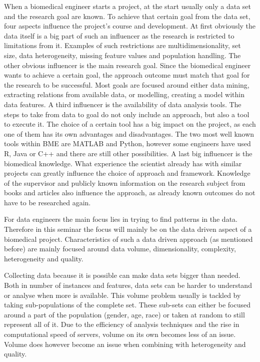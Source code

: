 \documentclass[10pt,a4paper]{article}
\begin{document}
	When a biomedical engineer starts a project, at the start usually only a data set and the research goal are known. To achieve that certain goal from the data set, four aspects influence the project's course and development. At first obviously the data itself is a big part of such an influencer as the research is restricted to limitations from it. Examples of such restrictions are multidimensionality, set size, data heterogeneity, missing feature values and population handling. The other obvious influencer is the main research goal. Since the biomedical engineer wants to achieve a certain goal, the approach outcome must match that goal for the research to be successful. Most goals are focused around either data mining, extracting relations from available data, or modelling, creating a model within data features. A third influencer is the availability of data analysis tools. The steps to take from data to goal do not only include an approach, but also a tool to execute it. The choice of a certain tool has a big impact on the project, as each one of them has its own advantages and disadvantages. The two most well known tools within BME are MATLAB and Python, however some engineers have used R, Java or C++ and there are still other possibilities. A last big influencer is the biomedical knowledge. What experience the scientist already has with similar projects can greatly influence the choice of approach and framework. Knowledge of the supervisor and publicly known information on the research subject from books and articles also influence the approach, as already known outcomes do not have to be researched again. 
	
	For data engineers the main focus lies in trying to find patterns in the data. Therefore in this seminar the focus will mainly be on the data driven aspect of a biomedical project. Characteristics of such a data driven approach (as mentioned before) are mainly focused around data volume, dimensionality, complexity, heterogeneity and quality.\cite{chen2006medical, doi:10.1093/bib/bbx044}
	
	Collecting data because it is possible can make data sets bigger than needed. Both in number of instances and features, data sets can be harder to understand or analyse when more is available.\cite{chen2006medical} This volume problem usually is tackled by taking sub-populations of the complete set. These sub-sets can either be focused around a part of the population (gender, age, race) or taken at random to still represent all of it. Due to the efficiency of analysis techniques and the rise in computational speed of servers\cite{blythe2008rise}, volume on its own becomes less of an issue. Volume does however become an issue when combining with heterogeneity and quality.\cite{Turkay2014, Holzinger2014} 
	
\end{document}
